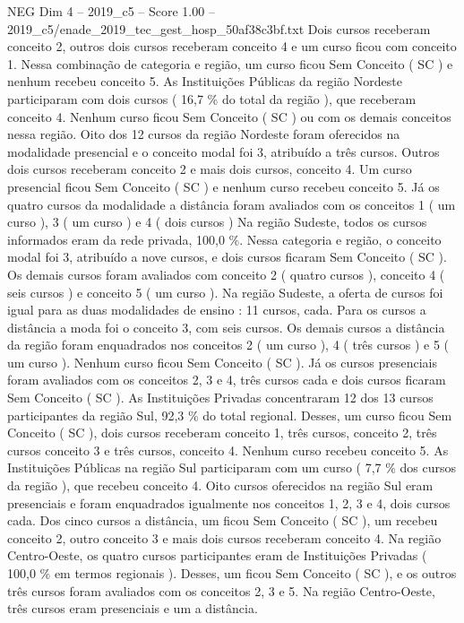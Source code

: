 \begin{textsample}{NEG Dim 4 – 2019\_c5 – Score 1.00 – 2019\_c5/enade\_2019\_tec\_gest\_hosp\_50af38c3bf.txt}
Dois cursos receberam conceito 2, outros dois cursos receberam conceito 4 e um curso ficou com conceito 1.
Nessa combinação de categoria e região, um curso ficou Sem Conceito ( SC ) e nenhum recebeu conceito 5.
As Instituições Públicas da região Nordeste participaram com dois cursos ( 16,7 \% do total da região ), que receberam conceito 4.
Nenhum curso ficou Sem Conceito ( SC ) ou com os demais conceitos nessa região.
Oito dos 12 cursos da região Nordeste foram oferecidos na modalidade presencial e o conceito modal foi 3, atribuído a três cursos.
Outros dois cursos receberam conceito 2 e mais dois cursos, conceito 4.
Um curso presencial ficou Sem Conceito ( SC ) e nenhum curso recebeu conceito 5.
Já os quatro cursos da modalidade a distância foram avaliados com os conceitos 1 ( um curso ), 3 ( um curso ) e 4 ( dois cursos ) Na região Sudeste, todos os cursos informados eram da rede privada, 100,0 \%.
Nessa categoria e região, o conceito modal foi 3, atribuído a nove cursos, e dois cursos ficaram Sem Conceito ( SC ).
Os demais cursos foram avaliados com conceito 2 ( quatro cursos ), conceito 4 ( seis cursos ) e conceito 5 ( um curso ).
Na região Sudeste, a oferta de cursos foi igual para as duas modalidades de ensino : 11 cursos, cada.
Para os cursos a distância a moda foi o conceito 3, com seis cursos.
Os demais cursos a distância da região foram enquadrados nos conceitos 2 ( um curso ), 4 ( três cursos ) e 5 ( um curso ).
Nenhum curso ficou Sem Conceito ( SC ).
Já os cursos presenciais foram avaliados com os conceitos 2, 3 e 4, três cursos cada e dois cursos ficaram Sem Conceito ( SC ).
As Instituições Privadas concentraram 12 dos 13 cursos participantes da região Sul, 92,3 \% do total regional.
Desses, um curso ficou Sem Conceito ( SC ), dois cursos receberam conceito 1, três cursos, conceito 2, três cursos conceito 3 e três cursos, conceito 4.
Nenhum curso recebeu conceito 5.
As Instituições Públicas na região Sul participaram com um curso ( 7,7 \% dos cursos da região ), que recebeu conceito 4.
Oito cursos oferecidos na região Sul eram presenciais e foram enquadrados igualmente nos conceitos 1, 2, 3 e 4, dois cursos cada.
Dos cinco cursos a distância, um ficou Sem Conceito ( SC ), um recebeu conceito 2, outro conceito 3 e mais dois cursos receberam conceito 4.
Na região Centro-Oeste, os quatro cursos participantes eram de Instituições Privadas ( 100,0 \% em termos regionais ).
Desses, um ficou Sem Conceito ( SC ), e os outros três cursos foram avaliados com os conceitos 2, 3 e 5.
Na região Centro-Oeste, três cursos eram presenciais e um a distância.

\end{textsample}
